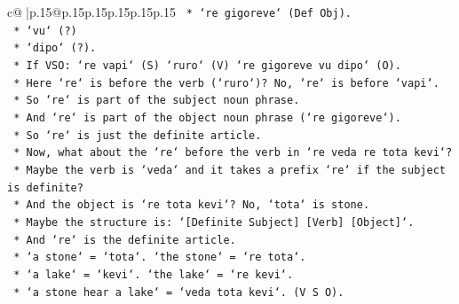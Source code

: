 \documentclass{article}
\begin{document}
{\begin{supertabular}{c@{$\;$}|p{.15\linewidth}@{}p{.15\linewidth}p{.15\linewidth}p{.15\linewidth}p{.15\linewidth}p{.15\linewidth}}
{{{\texttt{                                                                *   `re gigoreve` (Def Obj).} \\
\texttt{                                                                *   `vu` (?)} \\
\texttt{                                                                *   `dipo` (?).} \\
\texttt{                                                                *   If VSO: `re vapi` (S) `ruro` (V) `re gigoreve vu dipo` (O).} \\
\texttt{                                                                *   Here `re` is before the verb (`ruro`)? No, `re` is before `vapi`.} \\
\texttt{                                                                *   So `re` is part of the subject noun phrase.} \\
\texttt{                                                                *   And `re` is part of the object noun phrase (`re gigoreve`).} \\
\texttt{                                                                *   So `re` is just the definite article.} \\
\texttt{                                                                *   Now, what about the `re` before the verb in `re veda re tota kevi`?} \\
\texttt{                                                                *   Maybe the verb is `veda` and it takes a prefix `re` if the subject is definite?} \\
\texttt{                                                                *   And the object is `re tota kevi`? No, `tota` is stone.} \\
\texttt{                                                                *   Maybe the structure is: `{[}Definite Subject{]} {[}Verb{]} {[}Object{]}`.} \\
\texttt{                                                                *   And `re` is the definite article.} \\
\texttt{                                                                *   `a stone` = `tota`. `the stone` = `re tota`.} \\
\texttt{                                                                *   `a lake` = `kevi`. `the lake` = `re kevi`.} \\
\texttt{                                                                *   `a stone hear a lake` = `veda tota kevi`. (V S O).} \\
}}}
\end{supertabular}}
\end{document}
